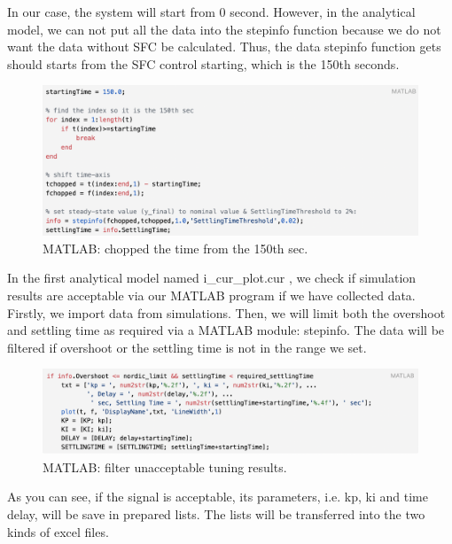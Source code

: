 \documentclass{report}
\begin{document}
In our case, the system will start from 0 second. However, in the analytical model, we can not put all the data into the stepinfo function because we do not want the data without SFC be calculated. Thus, the data stepinfo function gets should starts from the SFC control starting, which is the 150th seconds. \\

\begin{figure}[htbp]
\centering
\includegraphics[width = .999\textwidth]{figure/3_4_2_chopped.png}
\caption{MATLAB: chopped the time from the 150th sec.}
\label{3_4_2_chopped}
\end{figure}


In the first analytical model named i\_cur\_plot.cur , we check if simulation results are acceptable via our MATLAB program if we have collected data. Firstly, we import data from simulations. Then, we will limit both the overshoot and settling time as required via a MATLAB module: stepinfo. The data will be filtered if overshoot or the settling time is not in the range we set.\\

\begin{figure}[htbp]
\centering
\includegraphics[width = .999\textwidth]{figure/3_4_2_code5.png}
\caption{MATLAB: filter unacceptable tuning results.}
\label{3_4_2_code5}
\end{figure}


As you can see, if the signal is acceptable, its parameters, i.e. kp, ki and time delay, will be save in prepared lists. The lists will be transferred into the two kinds of excel files.\\
\end{document}
